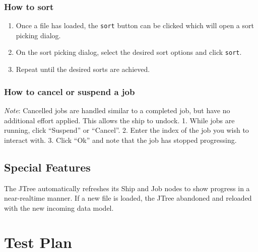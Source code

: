 \documentclass[english,floatsintext,man]{apa6}
\providecommand{\tightlist}{%
  \setlength{\itemsep}{0pt}\setlength{\parskip}{0pt}}
\begin{document}
\subsubsection{How to sort}\label{how-to-sort}

\begin{enumerate}
\def\labelenumi{\arabic{enumi}.}
\tightlist
\item
  Once a file has loaded, the \texttt{sort} button can be clicked which
  will open a sort picking dialog.
\item
  On the sort picking dialog, select the desired sort options and click
  \texttt{sort}.
\item
  Repeat until the desired sorts are achieved.
\end{enumerate}

\subsubsection{How to cancel or suspend a
job}\label{how-to-cancel-or-suspend-a-job}

\emph{Note}: Cancelled jobs are handled similar to a completed job, but
have no additional effort applied. This allows the ship to undock. 1.
While jobs are running, click \enquote{Suspend} or \enquote{Cancel}. 2.
Enter the index of the job you wish to interact with. 3. Click
\enquote{Ok} and note that the job has stopped progressing.

\subsection{Special Features}\label{special-features}

The JTree automatically refreshes its Ship and Job nodes to show
progress in a near-realtime manner. If a new file is loaded, the JTree
abandoned and reloaded with the new incoming data model.

\section{Test Plan}\label{test-plan}
\end{document}
